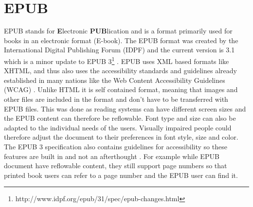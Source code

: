 \section{EPUB}
EPUB stands for {\bf E}lectronic {\bf PUB}lication and is a format primarily used for books in an electronic format (E-book). The EPUB format was created by the International Digital Publishing Forum (IDPF) and the current version is 3.1 which is a minor update to EPUB 3\footnote{http://www.idpf.org/epub/31/spec/epub-changes.html} \cite{EPUBspecs}. EPUB uses XML based formats like XHTML, and thus also uses the accessibility standards and guidelines already established in many nations like the Web Content Accessibility Guidelines (WCAG) \cite{WCAG}. Unlike HTML it is self contained format, meaning that images and other files are included in the format and don't have to be transferred with EPUB files. This was done as reading systems can have different screen sizes and the EPUB content can therefore be reflowable. Font type and size can also be adapted to the individual needs of the users. Visually impaired people could therefore adjust the document to their preferences in font style, size and color. The EPUB 3 specification also contains guidelines for accessibility so these features are built in and not an afterthought \cite{EPUB3bp}. For example while EPUB document have reflowable content, they still support page numbers so that printed book users can refer to a page number and the EPUB user can find it.





